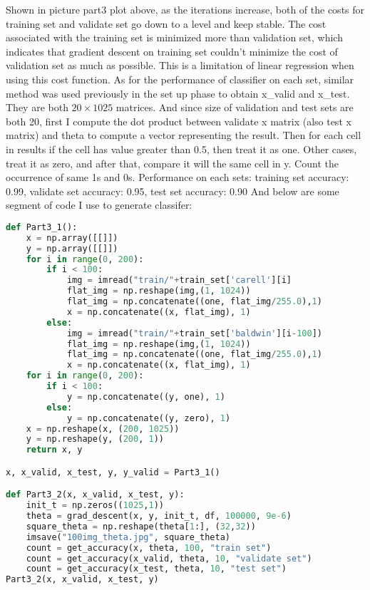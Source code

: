 \documentclass{article}
\begin{document}
\vspace*{0.5cm}
Shown in picture part3 plot above, as the iterations increase, both of the costs for training set and validate set go down to a level and keep stable. The cost associated with the training set is minimized more than validation set, which indicates that gradient descent on training set couldn't minimize the cost of validation set as much as possible. This is a limitation of linear regression when using this cost function.
\newline
As for the performance of classifier on each set, similar method was used previously in the set up phase to obtain x\_valid and x\_test. They are both $20 \times 1025$ matrices. And since size of validation and test sets are both 20, first I compute the dot product between validate x matrix (also test x matrix) and theta to compute a vector representing the result. Then for each cell in results if the cell has value greater than 0.5, then treat it as one. Other cases, treat it as zero, and after that, compare it will the same cell in y. Count the occurrence of same 1s and 0s. \newline
Performance on each sets: \newline
training set accuracy: 0.99, validate set accuracy: 0.95, test set accuracy: 0.90\newline 
And below are some segment of code I use to generate classifer:\newline
\begin{lstlisting}[language=Python, basicstyle=\ttfamily\large]
def Part3_1():
    x = np.array([[]])
    y = np.array([[]])
    for i in range(0, 200):
        if i < 100:
            img = imread("train/"+train_set['carell'][i]
            flat_img = np.reshape(img,(1, 1024))
            flat_img = np.concatenate((one, flat_img/255.0),1)
            x = np.concatenate((x, flat_img), 1)      
        else:
            img = imread("train/"+train_set['baldwin'][i-100])
            flat_img = np.reshape(img,(1, 1024))
            flat_img = np.concatenate((one, flat_img/255.0),1)
            x = np.concatenate((x, flat_img), 1)  
    for i in range(0, 200):
        if i < 100:
            y = np.concatenate((y, one), 1)
        else:
            y = np.concatenate((y, zero), 1) 
    x = np.reshape(x, (200, 1025))
    y = np.reshape(y, (200, 1))
    return x, y

x, x_valid, x_test, y, y_valid = Part3_1()

def Part3_2(x, x_valid, x_test, y):
    init_t = np.zeros((1025,1))
    theta = grad_descent(x, y, init_t, df, 100000, 9e-6)
    square_theta = np.reshape(theta[1:], (32,32))
    imsave("100img_theta.jpg", square_theta)
    count = get_accuracy(x, theta, 100, "train set")
    count = get_accuracy(x_valid, theta, 10, "validate set")
    count = get_accuracy(x_test, theta, 10, "test set")
Part3_2(x, x_valid, x_test, y)
\end{lstlisting}
\end{document}
